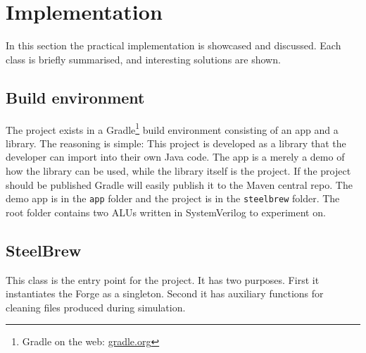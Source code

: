 \section{Implementation}\label{sec:06}
In this section the practical implementation is showcased and discussed. Each class is briefly summarised, and interesting solutions are shown.
\subsection{Build environment}
The project exists in a Gradle\footnote{Gradle on the web: \href{https://gradle.org/}{gradle.org}} build environment consisting of an app and a library. The reasoning is simple: This project is developed as a library that the developer can import into their own Java code. The app is a merely a demo of how the library can be used, while the library itself is the project. If the project should be published Gradle will easily publish it to the Maven central repo. The demo app is in the \texttt{app} folder and the project is in the \texttt{steelbrew} folder. The root folder contains two ALUs written in SystemVerilog to experiment on.
\subsection{SteelBrew}
This class is the entry point for the project. It has two purposes. First it instantiates the Forge as a singleton. Second it has auxiliary functions for cleaning files produced during simulation.
